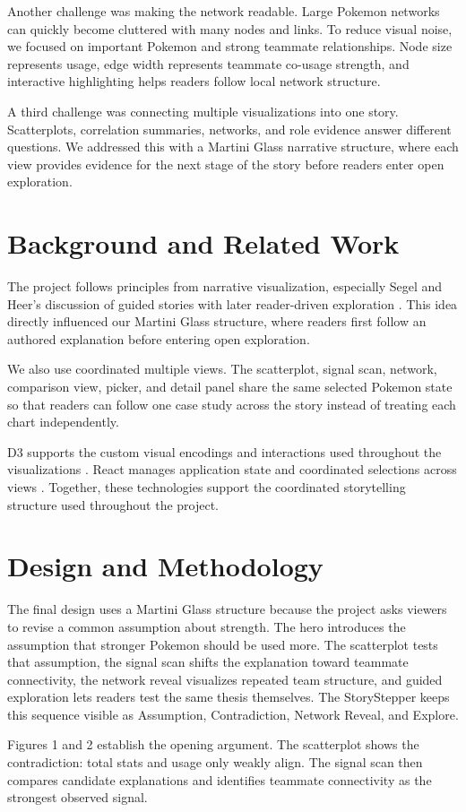 \documentclass[11pt]{article}
\newcommand{\tightsection}[1]{\vspace{-0.25em}\section{#1}\vspace{-0.25em}}
\begin{document}
Another challenge was making the network readable. Large Pokemon networks can quickly become cluttered with many nodes and links. To reduce visual noise, we focused on important Pokemon and strong teammate relationships. Node size represents usage, edge width represents teammate co-usage strength, and interactive highlighting helps readers follow local network structure.

A third challenge was connecting multiple visualizations into one story. Scatterplots, correlation summaries, networks, and role evidence answer different questions. We addressed this with a Martini Glass narrative structure, where each view provides evidence for the next stage of the story before readers enter open exploration.

\tightsection{Background and Related Work}
The project follows principles from narrative visualization, especially Segel and Heer’s discussion of guided stories with later reader-driven exploration \cite{segel2010narrative}. This idea directly influenced our Martini Glass structure, where readers first follow an authored explanation before entering open exploration.

We also use coordinated multiple views. The scatterplot, signal scan, network, comparison view, picker, and detail panel share the same selected Pokemon state so that readers can follow one case study across the story instead of treating each chart independently.

D3 supports the custom visual encodings and interactions used throughout the visualizations \cite{d3js}. React manages application state and coordinated selections across views \cite{react}. Together, these technologies support the coordinated storytelling structure used throughout the project.

\tightsection{Design and Methodology}
The final design uses a Martini Glass structure because the project asks viewers to revise a common assumption about strength. The hero introduces the assumption that stronger Pokemon should be used more. The scatterplot tests that assumption, the signal scan shifts the explanation toward teammate connectivity, the network reveal visualizes repeated team structure, and guided exploration lets readers test the same thesis themselves. The StoryStepper keeps this sequence visible as Assumption, Contradiction, Network Reveal, and Explore.

Figures 1 and 2 establish the opening argument. The scatterplot shows the contradiction: total stats and usage only weakly align. The signal scan then compares candidate explanations and identifies teammate connectivity as the strongest observed signal.
\end{document}
